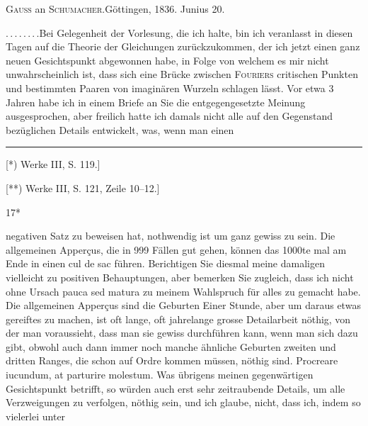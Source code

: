 \begin{center}\large\textsc{Gauss} an \textsc{Schumacher}.\quad Göttingen, 1836. Junius 20.\end{center}
\noindent .\,.\,.\,.\,.\,.\,.\,.\quad Bei Gelegenheit der Vorlesung, die ich halte, bin ich veranlasst
in diesen Tagen auf die Theorie der Gleichungen zurückzukommen, der ich
jetzt einen ganz neuen Gesichtspunkt abgewonnen habe, in Folge von welchem
es mir nicht unwahrscheinlich ist, dass sich  eine Brücke zwischen
\textsc{Fouriers} critischen Punkten und bestimmten Paaren von imaginären Wurzeln
schlagen lässt. Vor etwa 3 Jahren habe ich in einem Briefe an Sie die entgegengesetzte
Meinung ausgesprochen, aber freilich hatte ich damals nicht
alle auf den Gegenstand bezüglichen Details entwickelt, was, wenn man einen
\par\smallskip\noindent\rule{.25\linewidth}{.4pt}\par\smallskip
{\small\noindent\hspace*{\parindent}[*) Werke III, S. 119.]\par
\noindent\hspace*{\parindent}[**) Werke III, S. 121, Zeile 10--12.]\par}
\par\vfill\hfill17*\par
\clearpage
{}
\noindent negativen Satz zu beweisen hat, nothwendig ist um ganz gewiss zu sein. Die
allgemeinen Apperçus, die in 999 Fällen gut gehen, können das 1000te mal am
Ende in einen cul de sac führen. Berichtigen Sie diesmal meine damaligen
vielleicht zu positiven Behauptungen, aber bemerken Sie zugleich, dass ich
nicht ohne Ursach pauca sed matura zu meinem Wahlspruch für alles zu
 gemacht habe. Die allgemeinen Apperçus sind die Geburten
Einer Stunde, aber um daraus etwas gereiftes zu machen, ist oft lange,
oft jahrelange grosse Detailarbeit nöthig, von der man voraussieht, dass man
sie gewiss durchführen kann, wenn man sich dazu gibt, obwohl auch dann
immer noch manche ähnliche Geburten zweiten und dritten Ranges, die schon
auf Ordre kommen müssen, nöthig sind. Procreare iucundum, at parturire
molestum. Was übrigens meinen gegenwärtigen Gesichtspunkt betrifft, so
würden auch erst sehr zeitraubende Details, um alle Verzweigungen zu verfolgen,
nöthig sein, und ich glaube, nicht, dass ich, indem so vielerlei unter
